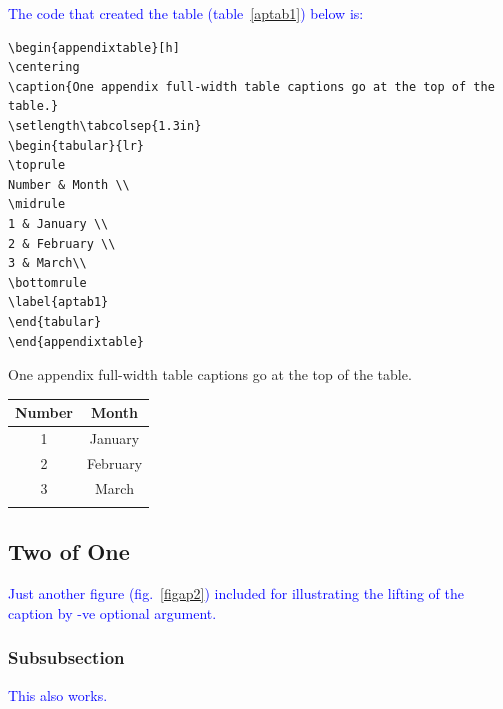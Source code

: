 \documentclass[phd,showgrids]{ndsu-thesis-2022}
\newcommand\italk[1]{\textcolor{blue}{#1}}  %
\begin{document}
\italk{The code that created the table (table~\ref{aptab1}) below is:}

{\onehalfspacing
\begin{verbatim}
\begin{appendixtable}[h]
\centering
\caption{One appendix full-width table captions go at the top of the table.}
\setlength\tabcolsep{1.3in}
\begin{tabular}{lr}
\toprule
Number & Month \\
\midrule
1 & January \\
2 & February \\
3 & March\\
\bottomrule
\label{aptab1}
\end{tabular}
\end{appendixtable}
\end{verbatim}
}

\begin{appendixtable}[h]
\centering
\caption{One appendix full-width table captions go at the top of the table.}
\setlength\tabcolsep{1.3in}
\begin{tabular}{cc}
\toprule
Number & Month \\
\midrule
1 & January \\
2 & February \\
3 & March\\
\bottomrule
\label{aptab1}
\end{tabular}
\end{appendixtable}

\subsection{Two of One}

\italk{Just another figure (fig.~\ref{figap2}) included for illustrating the lifting of the caption by -ve optional argument. }


\subsubsection{Subsubsection}
\italk{This also works.}


\end{document}
